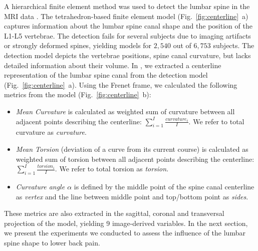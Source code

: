 \documentclass[a4paper,twoside]{style/article}
\begin{document}
A hierarchical finite element method was used to detect the lumbar spine in the MRI data \cite{Rak2013}.
The tetrahedron-based finite element model (Fig.~\ref{fig:centerline}~a) captures information about the lumbar spine canal shape and the position of the L1-L5 vertebrae.
The detection fails for several subjects due to imaging artifacts or strongly deformed spines, yielding models for $2,540$ out of $6,753$ subjects.
The detection model depicts the vertebrae positions, spine canal curvature, but lacks detailed information about their volume.
In \cite{Klemm2013VMV}, we extracted a centerline representation of the lumbar spine canal from the detection model (Fig.~\ref{fig:centerline}~a).
Using the Frenet frame, we calculated the following metrics from the model (Fig.~\ref{fig:centerline}~b): %
\begin{itemize}
	\item \emph{Mean Curvature} is calculated as weighted sum of curvature between all adjacent points describing the centerline: $\sum_{i=1}^I \frac{curvature_i}{I}$. We refer to total curvature as \emph{curvature}.
	\item \emph{Mean Torsion} (deviation of a curve from its current course) is calculated as weighted sum of torsion between all adjacent points describing the centerline: $\sum_{i=1}^I \frac{torsion_i}{I}$. We refer to total torsion as \emph{torsion}.
	\item \emph{Curvature angle $\alpha$} is defined by the middle point of the spine canal centerline as \emph{vertex} and the line between middle point and top/bottom point as \emph{sides}.
\end{itemize}
These metrics are also extracted in the sagittal, coronal and transversal projection of the model, yielding 9 image-derived variables.
In the next section, we present the experiments we conducted to assess the influence of the lumbar spine shape to lower back pain.
\end{document}
